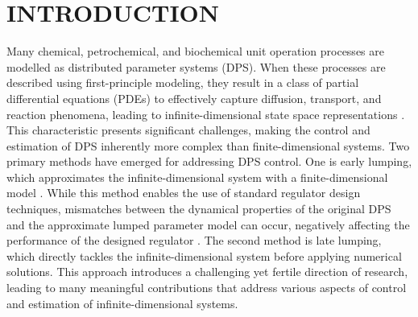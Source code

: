 \section{INTRODUCTION}

Many chemical, petrochemical, and biochemical unit operation processes are modelled as distributed parameter systems (DPS). When these processes are described using first-principle modeling, they result in a class of partial differential equations (PDEs) to effectively capture diffusion, transport, and reaction phenomena, leading to infinite-dimensional state space representations \autocite{ray1981advanced}. This characteristic presents significant challenges, making the control and estimation of DPS inherently more complex than finite-dimensional systems. Two primary methods have emerged for addressing DPS control. One is early lumping, which approximates the infinite-dimensional system with a finite-dimensional model \autocite{davison1976robust, francis1977linear}. While this method enables the use of standard regulator design techniques, mismatches between the dynamical properties of the original DPS and the approximate lumped parameter model can occur, negatively affecting the performance of the designed regulator \autocite{moghadam2012infinite}. The second method is late lumping, which directly tackles the infinite-dimensional system before applying numerical solutions. This approach introduces a challenging yet fertile direction of research, leading to many meaningful contributions that address various aspects of control and estimation of infinite-dimensional systems.

